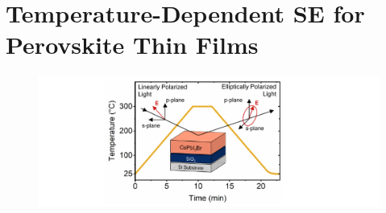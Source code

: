 \section{Temperature-Dependent SE for Perovskite Thin Films}

\begin{figure}[tbp]
  \centering
  \medskip
  \includegraphics[width=.99\textwidth]{chapters/ellipsometry/image/experiment_description.pdf}
  \caption{}
  \label{fig:ellipsometry:experiment_description}
\end{figure}

